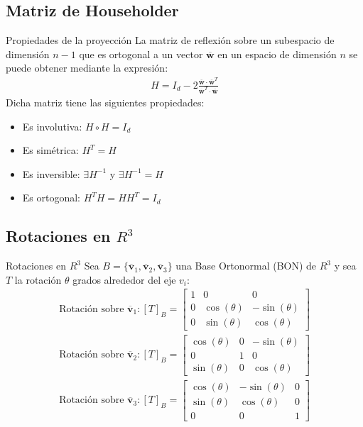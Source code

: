 \documentclass[a4paper, twoside]{article}
\numberwithin{equation}{section}
\numberwithin{figure}{section}
\numberwithin{table}{section}
\newcommand{\vect}[1]{\overline{\textbf{#1}}}
\begin{document}
\subsection{Matriz de Householder}
\begin{definicion*}{Propiedades de la proyección}
	La matriz de reflexión sobre un subespacio de dimensión $n-1$ que es ortogonal a un vector $\vect{w}$ en un espacio de dimensión $n$ se puede obtener mediante la expresión:
	\begin{align}
		H=I_d-2\frac{\vect{w} \cdot \vect{w}^T}{\vect{w}^T \cdot \vect{w}}
	\end{align}
	Dicha matriz tiene las siguientes propiedades:
	\begin{itemize}
		\item Es involutiva: $H \circ H=I_d$
		\item Es simétrica: $H^T=H$
		\item Es inversible: $\exists H^{-1}$ y $\exists H^{-1}=H$
		\item Es ortogonal: $H^T H=H H^T=I_d$
	\end{itemize}
\end{definicion*}

\subsection{Rotaciones en $R^3$}
\begin{definicion*}{Rotaciones en $R^3$}
	Sea $B=\{\vect{v}_1,\vect{v}_2,\vect{v}_3 \}$ una Base Ortonormal (BON) de $R^3$ y sea $T$ la rotación $\theta$ grados alrededor del eje $v_i$:
	\begin{align}
		\text{Rotación sobre } \vect{v}_1 :[T]_B =
			\begin{bmatrix}
				{1} & {0} & {0} \\
				{0} & {\cos (\theta)} & {-\sin(\theta)} \\
				{0} & {\sin (\theta)} & {\cos (\theta)}
			\end{bmatrix} \\
		\text{Rotación sobre } \vect{v}_2 :[T]_B =
			\begin{bmatrix}
				{\cos (\theta)} & {0} & {-\sin(\theta)} \\
				{0} & {1} & {0} \\
				{\sin (\theta)} & {0} & {\cos (\theta)}
			\end{bmatrix} \\
		\text{Rotación sobre } \vect{v}_3 :[T]_B =
			\begin{bmatrix}
				{\cos (\theta)} & {-\sin(\theta)} & {0} \\
				{\sin (\theta)} & {\cos (\theta)} & {0} \\
				{0} & {0} & {1}
			\end{bmatrix}
	\end{align}
\end{definicion*}
\end{document}
